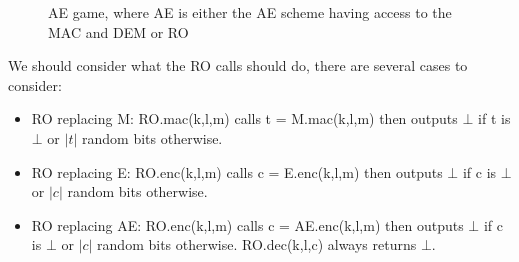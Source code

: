 \documentclass{article}
\begin{document}
\begin{figure}[H]
    \begin{pchstack}[boxed,center,space=0.5cm]
    \end{pchstack}
\caption{AE game, where AE is either the AE scheme having access to the MAC and DEM or RO}
\end{figure}
\noindent We should consider what the RO calls should do, there are several cases to consider:
\begin{itemize}
    \item RO replacing M: RO.mac(k,l,m) calls t = M.mac(k,l,m) then outputs $\bot$ if t is $\bot$ or $|t|$ random bits otherwise.
    \item RO replacing E: RO.enc(k,l,m) calls c = E.enc(k,l,m) then outputs $\bot$ if c is $\bot$ or $|c|$ random bits otherwise.
    \item RO replacing AE: RO.enc(k,l,m) calls c = AE.enc(k,l,m) then outputs $\bot$ if c is $\bot$ or $|c|$ random bits otherwise. RO.dec(k,l,c) always returns $\bot$.
\end{itemize}
\end{document}
